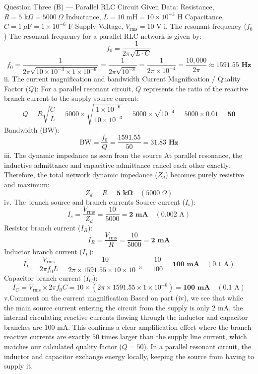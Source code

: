 Question Three (B) — Parallel RLC Circuit
Given Data:
Resistance, $R = 5\text{ k}\Omega = 5000\ \Omega$
Inductance, $L = 10\text{ mH} = 10 \times 10^{-3}\text{ H}$
Capacitance, $C = 1\ \mu\text{F} = 1 \times 10^{-6}\text{ F}$
Supply Voltage, $V_{\text{rms}} = 10\text{ V}$
i. The resonant frequency ($f_0$)
The resonant frequency for a parallel RLC network is given by:
$$f_0 = \frac{1}{2\pi \sqrt{L \cdot C}}$$ 
$$f_0 = \frac{1}{2\pi \sqrt{10 \times 10^{-3} \times 1 \times 10^{-6}}} = \frac{1}{2\pi \sqrt{10^{-8}}} = \frac{1}{2\pi \times 10^{-4}} = \frac{10,000}{2\pi} \approx \mathbf{1591.55\text{ Hz}}$$ 
ii. The current magnification and bandwidth
Current Magnification / Quality Factor ($Q$):
For a parallel resonant circuit, $Q$ represents the ratio of the reactive branch current to the supply source current:
$$Q = R \sqrt{\frac{C}{L}} = 5000 \times \sqrt{\frac{1 \times 10^{-6}}{10 \times 10^{-3}}} = 5000 \times \sqrt{10^{-4}} = 5000 \times 0.01 = \mathbf{50}$$ 
Bandwidth ($\text{BW}$):
$$\text{BW} = \frac{f_0}{Q} = \frac{1591.55}{50} = \mathbf{31.83\text{ Hz}}$$ 
iii. The dynamic impedance as seen from the source
At parallel resonance, the inductive admittance and capacitive admittance cancel each other exactly. Therefore, the total network dynamic impedance ($Z_d$) becomes purely resistive and maximum:
$$Z_d = R = \mathbf{5\text{ k}\Omega} \quad (5000\ \Omega)$$ 
iv. The branch source and branch currents
Source current ($I_s$):
$$I_s = \frac{V_{\text{rms}}}{Z_d} = \frac{10}{5000} = \mathbf{2\text{ mA}} \quad (0.002\text{ A})$$ 
Resistor branch current ($I_R$):
$$I_R = \frac{V_{\text{rms}}}{R} = \frac{10}{5000} = \mathbf{2\text{ mA}}$$ 
Inductor branch current ($I_L$):
$$I_L = \frac{V_{\text{rms}}}{2\pi f_0 L} = \frac{10}{2\pi \times 1591.55 \times 10 \times 10^{-3}} = \frac{10}{100} = \mathbf{100\text{ mA}} \quad (0.1\text{ A})$$ 
Capacitor branch current ($I_C$):
$$I_C = V_{\text{rms}} \times 2\pi f_0 C = 10 \times (2\pi \times 1591.55 \times 1 \times 10^{-6}) = \mathbf{100\text{ mA}} \quad (0.1\text{ A})$$ 
v.Comment on the current magnification
Based on part (iv), we see that while the main source current entering the circuit from the supply is only $2\text{ mA}$, the internal circulating reactive currents flowing through the inductor and capacitor branches are $100\text{ mA}$.
This confirms a clear amplification effect where the branch reactive currents are exactly $50\text{ times}$ larger than the supply line current, which matches our calculated quality factor ($Q = 50$). In a parallel resonant circuit, the inductor and capacitor exchange energy locally, keeping the source from having to supply it.
